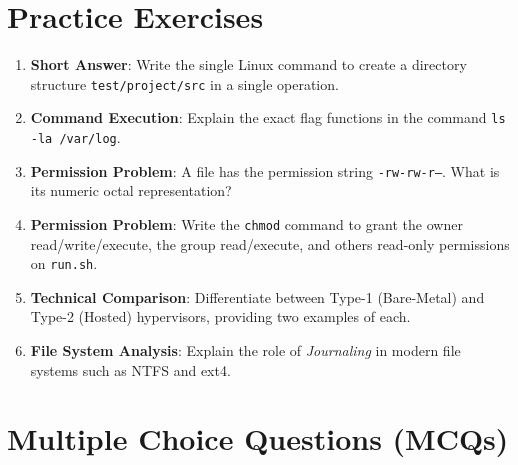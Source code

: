 \section{Practice Exercises}

\begin{practiceset}
\begin{enumerate}[leftmargin=1.5em]
    \item \textbf{Short Answer}: Write the single Linux command to create a directory structure \texttt{test/project/src} in a single operation.
    \item \textbf{Command Execution}: Explain the exact flag functions in the command \texttt{ls -la /var/log}.
    \item \textbf{Permission Problem}: A file has the permission string \texttt{-rw-rw-r--}. What is its numeric octal representation?
    \item \textbf{Permission Problem}: Write the \texttt{chmod} command to grant the owner read/write/execute, the group read/execute, and others read-only permissions on \texttt{run.sh}.
    \item \textbf{Technical Comparison}: Differentiate between Type-1 (Bare-Metal) and Type-2 (Hosted) hypervisors, providing two examples of each.
    \item \textbf{File System Analysis}: Explain the role of \textit{Journaling} in modern file systems such as NTFS and ext4.
\end{enumerate}
\end{practiceset}

\section{Multiple Choice Questions (MCQs)}

